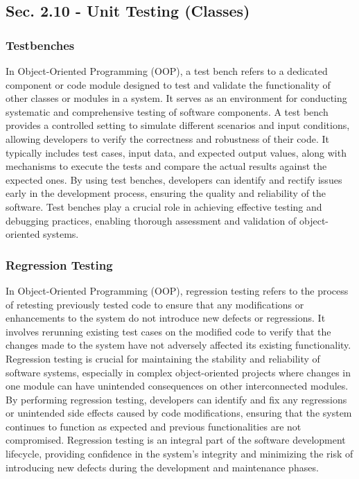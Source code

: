 \subsection*{Sec. 2.10 - Unit Testing (Classes)}
\subsubsection*{Testbenches}

In Object-Oriented Programming (OOP), a test bench refers to a dedicated component or code module designed to test and validate the functionality of other classes or modules in a system. It serves as an environment for conducting systematic and comprehensive 
testing of software components. A test bench provides a controlled setting to simulate different scenarios and input conditions, allowing developers to verify the correctness and robustness of their code. It typically includes test cases, input data, and expected 
output values, along with mechanisms to execute the tests and compare the actual results against the expected ones. By using test benches, developers can identify and rectify issues early in the development process, ensuring the quality and reliability of the 
software. Test benches play a crucial role in achieving effective testing and debugging practices, enabling thorough assessment and validation of object-oriented systems.

\subsubsection*{Regression Testing}

In Object-Oriented Programming (OOP), regression testing refers to the process of retesting previously tested code to ensure that any modifications or enhancements to the system do not introduce new defects or regressions. It involves rerunning existing test cases 
on the modified code to verify that the changes made to the system have not adversely affected its existing functionality. Regression testing is crucial for maintaining the stability and reliability of software systems, especially in complex object-oriented projects 
where changes in one module can have unintended consequences on other interconnected modules. By performing regression testing, developers can identify and fix any regressions or unintended side effects caused by code modifications, ensuring that the system continues 
to function as expected and previous functionalities are not compromised. Regression testing is an integral part of the software development lifecycle, providing confidence in the system's integrity and minimizing the risk of introducing new defects during the development 
and maintenance phases.

